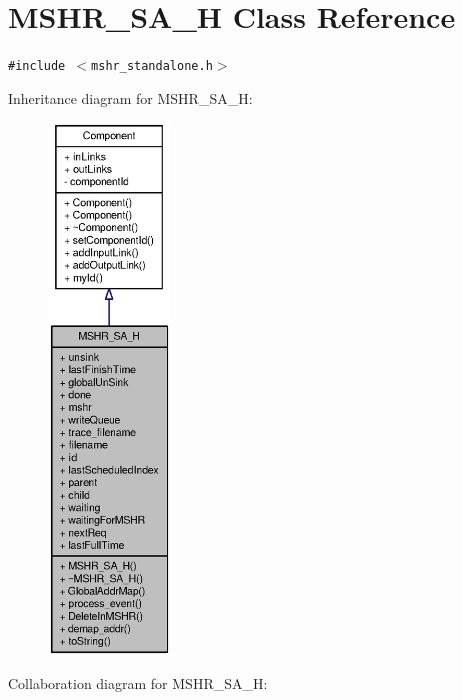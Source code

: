 \section{MSHR\_\-SA\_\-H Class Reference}
\label{classMSHR__SA__H}
{\tt \#include $<$mshr\_\-standalone.h$>$}

Inheritance diagram for MSHR\_\-SA\_\-H:\nopagebreak
\begin{figure}[H]
\begin{center}
\leavevmode
\includegraphics[height=400pt]{classMSHR__SA__H__inherit__graph}
\end{center}
\end{figure}
Collaboration diagram for MSHR\_\-SA\_\-H:\nopagebreak
